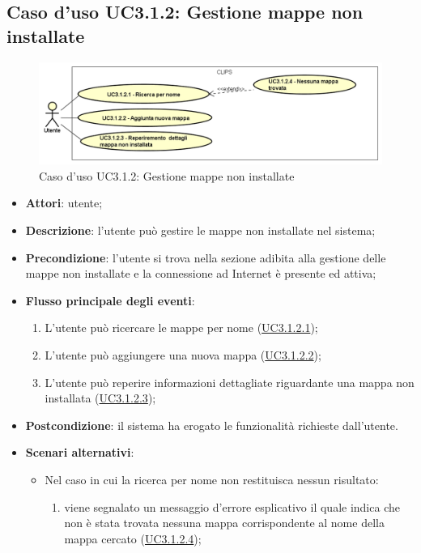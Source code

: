 \documentclass[../AnalisiDeiRequisiti.tex]{subfiles}
\begin{document}
\subsection{Caso d'uso UC3.1.2: Gestione mappe non installate}

        \begin{figure}[H]
            \centering
            \includegraphics[scale=0.95, width=\textwidth]{img/UC3-1-2.png}
            \caption{Caso d'uso UC3.1.2: Gestione mappe non installate}\label{fig:UC3.1.2} 
        \end{figure}
\begin{itemize}
\item \textbf{Attori}: utente;
\item \textbf{Descrizione}: l'utente può gestire le mappe non installate nel sistema; 
      \item \textbf{Precondizione}: l'utente si trova nella sezione adibita alla gestione delle mappe non installate e la connessione ad Internet è presente ed attiva;

        \item \textbf{Flusso principale degli eventi}:
          \begin{enumerate}
          \item L'utente può ricercare le mappe per nome (\hyperlink{UC3.1.2.1}{UC3.1.2.1});
          \item L'utente può aggiungere una nuova mappa (\hyperlink{UC3.1.2.2}{UC3.1.2.2});
          \item L'utente può reperire informazioni dettagliate riguardante una mappa non installata (\hyperlink{UC3.1.2.3}{UC3.1.2.3});

      \end{enumerate}
    \item \textbf{Postcondizione}: il sistema ha erogato le funzionalità richieste dall'utente.
     \item \textbf{Scenari alternativi}: 
      \begin{itemize}
       \item Nel caso in cui la ricerca per nome non restituisca nessun risultato: 
       \begin{enumerate}
          \item viene segnalato un messaggio d'errore esplicativo il quale indica che non è stata trovata nessuna mappa corrispondente al nome della mappa cercato (\hyperlink{UC3.1.2.4}{UC3.1.2.4});
       \end{enumerate}
      \end{itemize}
  \end{itemize}
\hypertarget{UC3.1.2.1}{}
\end{document}

